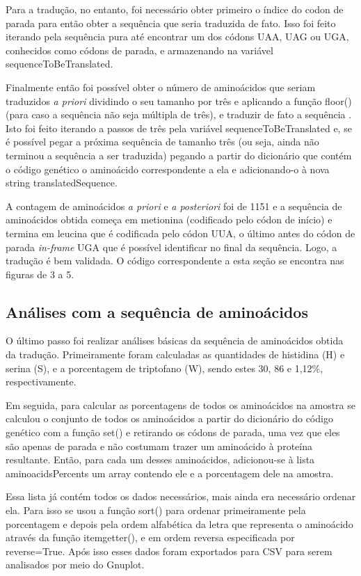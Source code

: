 \documentclass[brazilian,12pt,a4paper,final]{article}
\begin{document}
	Para a tradução, no entanto, foi necessário obter primeiro o índice do codon de parada para então obter a sequência que seria traduzida de fato. Isso foi feito iterando pela sequência pura até encontrar um dos códons UAA, UAG ou UGA, conhecidos como códons de parada, e armazenando na variável sequenceToBeTranslated.
	
	Finalmente então foi possível obter o número de aminoácidos que seriam traduzidos \textit{a priori} dividindo o seu tamanho por três e aplicando a função floor() (para caso a sequência não seja múltipla de três), e traduzir de fato a sequência . Isto foi feito iterando a passos de três pela variável sequenceToBeTranslated e, se é possível pegar a próxima sequência de tamanho três (ou seja, ainda não terminou a sequência a ser traduzida)  pegando a partir do dicionário que contém o código genético o aminoácido correspondente a ela e adicionando-o à nova string translatedSequence.
	
	A contagem de aminoácidos \textit{a priori} e \textit{a posteriori} foi de 1151 e a sequência de aminoácidos obtida começa em metionina (codificado pelo códon de início) e termina em leucina que é codificada pelo códon UUA, o último antes do códon de parada \textit{in-frame} UGA que é possível identificar no final da sequência. Logo, a tradução é bem validada. O código correspondente a esta seção se encontra nas figuras de 3 a 5.
	
	
	\subsection{Análises com a sequência de aminoácidos}
	O último passo foi realizar análises básicas da sequência de aminoácidos obtida da tradução. Primeiramente foram calculadas as quantidades de histidina (H) e serina (S), e a porcentagem de triptofano (W), sendo estes 30, 86 e 1,12\%, respectivamente.
	
	Em seguida, para calcular as porcentagens de todos os aminoácidos na amostra se calculou o conjunto de todos os aminoácidos a partir do dicionário do código genético com a função set() e retirando os códons de parada, uma vez que eles são apenas de parada e não costumam trazer um aminoácido à proteína resultante. Então, para cada um desses aminoácidos, adicionou-se à lista aminoacidsPercents um array contendo ele e a porcentagem dele na amostra.
	
	Essa lista já contém todos os dados necessários, mais ainda era necessário ordenar ela. Para isso se usou a função sort() para ordenar primeiramente pela porcentagem e depois pela ordem alfabética da letra que representa o aminoácido através da função itemgetter(), e em ordem reversa especificada por reverse=True. Após isso esses dados foram exportados para CSV para serem analisados por meio do Gnuplot.
	
\end{document}
